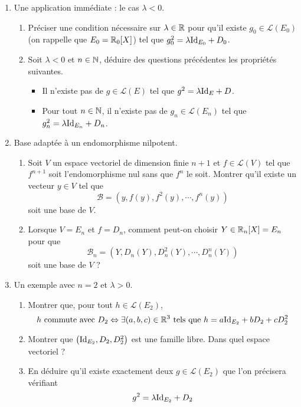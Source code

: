 \begin{enumerate}
\begin{enumerate}
\end{enumerate}
\item Une application immédiate : le cas $\lambda <0$.
\begin{enumerate}
\item Préciser une condition nécessaire sur $\lambda\in \mathbb{R}$ pour qu'il existe $g_0\in \mathcal{L}(E_0)$ (on rappelle que $E_0 = \mathbb{R}_0[X]$) tel que $g_0^2 = \lambda {\operatorname{Id}}_{E_0} + D_0$.
\item Soit $\lambda < 0$ et $n\in \mathbb{N}$, déduire des questions précédentes les propriétés suivantes.
\begin{itemize}
 \item Il n'existe pas de $g\in \mathcal{L}(E)$ tel que $g^2 = \lambda {\operatorname{Id}}_{E} + D$.
 \item Pour tout $n\in \mathbb{N}$, il n'existe pas de $g_n\in \mathcal{L}(E_n)$ tel que $g_n^2 = \lambda {\operatorname{Id}}_{E_n} + D_n$.
\end{itemize}
\end{enumerate}

\item Base adaptée à un endomorphisme nilpotent.
\begin{enumerate}
 \item Soit $V$ un espace vectoriel de dimension finie $n+1$ et $f\in \mathcal{L}(V)$ tel que $f^{n+1}$ soit l'endomorphisme nul sans que $f^n$ le soit.\newline
 Montrer qu'il existe un vecteur $y \in V$ tel que 
\begin{displaymath}
 \mathcal B = (y, f(y), f^2(y), \cdots, f^n(y))
\end{displaymath}
soit une base de $V$.
\item Lorsque $V=E_n$ et $f=D_n$, comment peut-on choisir $Y\in \mathbb{R}_n[X]=E_n$ pour que 
\begin{displaymath}
 \mathcal B_n = (Y, D_n(Y), D_n^2(Y), \cdots, D_n^n(Y))
\end{displaymath}
soit une base de $V$ ?
\end{enumerate}

\item Un exemple avec $n = 2$ et $\lambda >0$.
\begin{enumerate}
 \item Montrer que, pour tout $h \in \mathcal{L}(E_2)$,
\begin{displaymath}
h \text{ commute avec } D_2 \Leftrightarrow
\exists(a,b,c)\in \mathbb{R}^3 \text{ tels que } h = a{\operatorname{Id}}_{E_2} + bD_2 + c D_2^2
\end{displaymath}
\item Montrer que $\left(\operatorname{Id}_{E_2}, D_2, D_2^2 \right)$ est une famille libre. Dans quel espace vectoriel ? 
\item En déduire qu'il existe exactement deux $g \in \mathcal{L}(E_2)$ que l'on précisera vérifiant
\begin{displaymath}
 g^2 = \lambda {\operatorname{Id}}_{E_2} + D_2
\end{displaymath}
\end{enumerate}
\end{enumerate}

